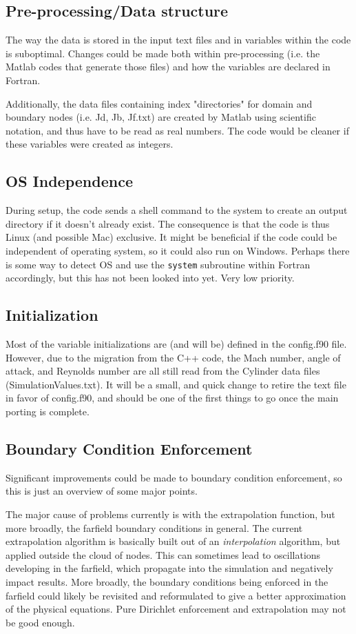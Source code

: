 \documentclass[12pt]{article}
\begin{document}
    \subsection{Pre-processing/Data structure}
    The way the data is stored in the input text files and in variables within the code is suboptimal. Changes could be made both within pre-processing (i.e. the Matlab codes that generate those files) and how the variables are declared in Fortran.

    Additionally, the data files containing index "directories" for domain and boundary nodes (i.e. Jd, Jb, Jf.txt) are created by Matlab using scientific notation, and thus have to be read as real numbers. The code would be cleaner if these variables were created as integers.

    \subsection{OS Independence}
    During setup, the code sends a shell command to the system to create an output directory if it doesn't already exist. The consequence is that the code is thus Linux (and possible Mac) exclusive. It might be beneficial if the code could be independent of operating system, so it could also run on Windows. Perhaps there is some way to detect OS and use the \texttt{system} subroutine within Fortran accordingly, but this has not been looked into yet. Very low priority.

    \subsection{Initialization}
    Most of the variable initializations are (and will be) defined in the config.f90 file. However, due to the migration from the C++ code, the Mach number, angle of attack, and Reynolds number are all still read from the Cylinder data files (SimulationValues.txt). It will be a small, and quick change to retire the text file in favor of config.f90, and should be one of the first things to go once the main porting is complete.

    \subsection{Boundary Condition Enforcement}
    Significant improvements could be made to boundary condition enforcement, so this is just an overview of some major points.
    
    The major cause of problems currently is with the extrapolation function, but more broadly, the farfield boundary conditions in general. The current extrapolation algorithm is basically built out of an \textit{interpolation} algorithm, but applied outside the cloud of nodes. This can sometimes lead to oscillations developing in the farfield, which propagate into the simulation and negatively impact results. More broadly, the boundary conditions being enforced in the farfield could likely be revisited and reformulated to give a better approximation of the physical equations. Pure Dirichlet enforcement and extrapolation may not be good enough.
\end{document}
